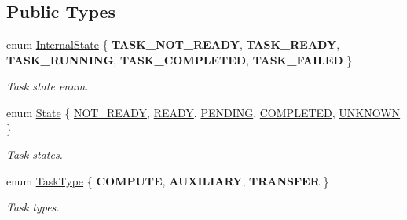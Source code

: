 \subsection*{Public Types}
\begin{DoxyCompactItemize}
\item 
\mbox{\label{classwrench_1_1_workflow_task_aa2b860941b37263c26385fd076502e04}} 
enum \hyperlink{classwrench_1_1_workflow_task_aa2b860941b37263c26385fd076502e04}{Internal\+State} \{ \newline
{\bfseries T\+A\+S\+K\+\_\+\+N\+O\+T\+\_\+\+R\+E\+A\+DY}, 
{\bfseries T\+A\+S\+K\+\_\+\+R\+E\+A\+DY}, 
{\bfseries T\+A\+S\+K\+\_\+\+R\+U\+N\+N\+I\+NG}, 
{\bfseries T\+A\+S\+K\+\_\+\+C\+O\+M\+P\+L\+E\+T\+ED}, 
\newline
{\bfseries T\+A\+S\+K\+\_\+\+F\+A\+I\+L\+ED}
 \}\begin{DoxyCompactList}\small\item\em Task state enum. \end{DoxyCompactList}
\item 
enum \hyperlink{classwrench_1_1_workflow_task_a1184f3d7aea21e1c87a9b17e84f1f92a}{State} \{ \newline
\hyperlink{classwrench_1_1_workflow_task_a1184f3d7aea21e1c87a9b17e84f1f92aa2fbcca8f5a8c10675c9036c61826e6bc}{N\+O\+T\+\_\+\+R\+E\+A\+DY}, 
\hyperlink{classwrench_1_1_workflow_task_a1184f3d7aea21e1c87a9b17e84f1f92aae983a946ee97e094f18524d6b392d2f9}{R\+E\+A\+DY}, 
\hyperlink{classwrench_1_1_workflow_task_a1184f3d7aea21e1c87a9b17e84f1f92aaa5207e01401874a04d2ddae6191fd9af}{P\+E\+N\+D\+I\+NG}, 
\hyperlink{classwrench_1_1_workflow_task_a1184f3d7aea21e1c87a9b17e84f1f92aa5f1f15812ee2b25d3b4f5229b283fc5c}{C\+O\+M\+P\+L\+E\+T\+ED}, 
\newline
\hyperlink{classwrench_1_1_workflow_task_a1184f3d7aea21e1c87a9b17e84f1f92aa1229246389ad56793373ebd4384ee05d}{U\+N\+K\+N\+O\+WN}
 \}\begin{DoxyCompactList}\small\item\em Task states. \end{DoxyCompactList}
\item 
\mbox{\label{classwrench_1_1_workflow_task_a490a935259b9425a3e4fb011a86cb4bf}} 
enum \hyperlink{classwrench_1_1_workflow_task_a490a935259b9425a3e4fb011a86cb4bf}{Task\+Type} \{ {\bfseries C\+O\+M\+P\+U\+TE}, 
{\bfseries A\+U\+X\+I\+L\+I\+A\+RY}, 
{\bfseries T\+R\+A\+N\+S\+F\+ER}
 \}\begin{DoxyCompactList}\small\item\em Task types. \end{DoxyCompactList}
\end{DoxyCompactItemize}
